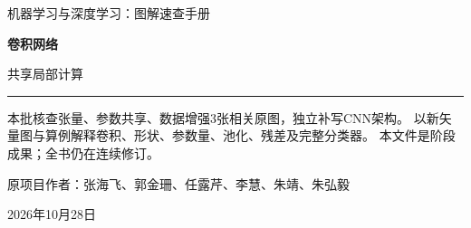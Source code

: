 \documentclass[a4paper,11pt,oneside,openany]{book}
\begin{document}
\frontmatter
\hypersetup{pageanchor=false}
\begin{titlepage}
\vspace*{16mm}
{\sffamily\color{Teal}\large 机器学习与深度学习：图解速查手册\par}
\vspace{15mm}
{\sffamily\bfseries\color{Ink}\Huge 卷积网络\par}
\vspace{6mm}
{\sffamily\color{Ink}\LARGE 共享局部计算\par}
\vspace{12mm}
\noindent\textcolor{Teal}{\rule{\textwidth}{1.2pt}}
\vspace{7mm}
\begin{keyidea}[第十批阶段样章]
本批核查张量、参数共享、数据增强3张相关原图，独立补写CNN架构。
以新矢量图与算例解释卷积、形状、参数量、池化、残差及完整分类器。
本文件是阶段成果；全书仍在连续修订。
\end{keyidea}
\vfill
原项目作者：张海飞、郭金珊、任露芹、李慧、朱靖、朱弘毅\par
\vspace{4mm}
2026年10月28日\par
\end{titlepage}
\hypersetup{pageanchor=true}
\tableofcontents
\mainmatter
\setcounter{chapter}{9}

\end{document}
